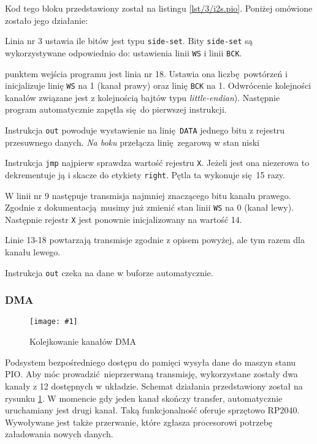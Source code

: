 \documentclass[polish]{aghengthesis}
\let\tempone\itemize
\let\temptwo\enditemize
\renewenvironment{itemize}{\tempone\setlength{\itemsep}{0cm}}{\temptwo}
\newcommand{\imgint}[4]{
	\begin{figure}[{#4}]
		\centering
		\texttt{[image: \#1]}
		\caption{#2}
		\label{#1}
	\end{figure}
}
\newcommand{\imgcs}[3]{\imgint{#1}{#2}{#3}{}}
\newcommand{\isqs}{$\text{I}^{2}\text{S}$}
\newcommand{\lstfile}[3]{
	\noindent
	\hspace{0.1\linewidth}
	\begin{minipage}{0.8\linewidth}
		
	\end{minipage}
	\vspace{0.3cm}
}
\begin{document}
				\lstfile{pio}{Kod programu \isqs{}}{lst/3/i2s.pio}
				
				Kod tego bloku przedstawiony został na listingu \ref{lst/3/i2s.pio}. Poniżej omówione zostało jego działanie:
				\begin{itemize}
					\item Linia nr 3 ustawia ile bitów jest typu \lstinline|side-set|. Bity \lstinline|side-set| są wykorzystywane odpowiednio do: ustawienia linii \lstinline|WS| i linii \lstinline|BCK|.
					
					\item punktem wejścia programu jest linia nr 18. Ustawia ona liczbę powtórzeń i inicjalizuje linię \lstinline|WS| na 1 (kanał prawy) oraz linię \lstinline|BCK| na 1. Odwrócenie kolejności kanałów związane jest z kolejnością bajtów typu \textit{little-endian}). Następnie program automatycznie zapętla się do pierwszej instrukcji.
					
					\item Instrukcja \lstinline|out| powoduje wystawienie na linię \lstinline|DATA| jednego bitu z rejestru przesuwnego danych. \textit{Na boku} przełącza linię zegarową w stan niski
					
					\item Instrukcja \lstinline|jmp| najpierw sprawdza wartość rejestru \lstinline|X|. Jeżeli jest ona niezerowa to dekrementuje ją i skacze do etykiety \lstinline|right|. Pętla ta wykonuje się 15 razy.
					
					\item W linii nr 9 następuje transmisja najmniej znaczącego bitu kanału prawego. Zgodnie z dokumentacją musimy już zmienić stan linii \lstinline|WS| na 0 (kanał lewy). Następnie rejestr \lstinline|X| jest ponownie inicjalizowany na wartość 14.
					
					\item Linie 13-18 powtarzają transmisje zgodnie z opisem powyżej, ale tym razem dla kanału lewego.
				\end{itemize}
				
				Instrukcja \lstinline|out| czeka na dane w buforze automatycznie.
			
			\subsubsection{DMA}
				\imgcs{3/dma_chain}{Kolejkowanie kanałów DMA}{0.55}
				Podsystem bezpośredniego dostępu do pamięci wysyła dane do maszyn stanu PIO. Aby móc prowadzić nieprzerwaną transmisję, wykorzystane zostały dwa kanały z 12 dostępnych w układzie. Schemat działania przedstawiony został na rysunku \ref{3/dma_chain}. W momencie gdy jeden kanał skończy transfer, automatycznie uruchamiany jest drugi kanał. Taką funkcjonalność oferuje sprzętowo RP2040. Wywoływane jest także przerwanie, które zgłasza procesorowi potrzebę załadowania nowych danych.
		
\end{document}
